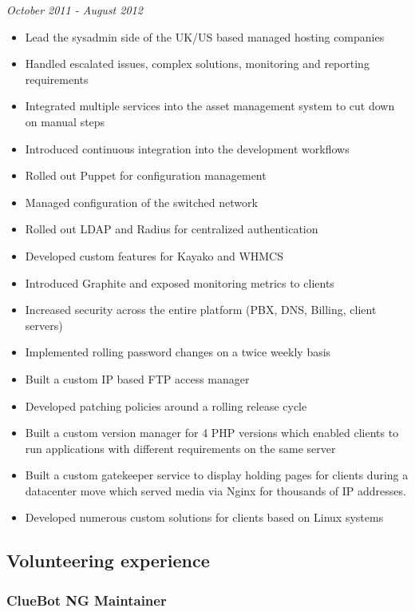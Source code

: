 \emph{October 2011 - August 2012}

\begin{itemize}
\itemsep1pt\parskip0pt
\item
  Lead the sysadmin side of the UK/US based managed hosting companies
\item
  Handled escalated issues, complex solutions, monitoring and reporting
  requirements
\item
  Integrated multiple services into the asset management system to cut
  down on manual steps
\item
  Introduced continuous integration into the development workflows
\item
  Rolled out Puppet for configuration management
\item
  Managed configuration of the switched network
\item
  Rolled out LDAP and Radius for centralized authentication
\item
  Developed custom features for Kayako and WHMCS
\item
  Introduced Graphite and exposed monitoring metrics to clients
\item
  Increased security across the entire platform (PBX, DNS, Billing,
  client servers)
\item
  Implemented rolling password changes on a twice weekly basis
\item
  Built a custom IP based FTP access manager
\item
  Developed patching policies around a rolling release cycle
\item
  Built a custom version manager for 4 PHP versions which enabled
  clients to run applications with different requirements on the same
  server
\item
  Built a custom gatekeeper service to display holding pages for clients
  during a datacenter move which served media via Nginx for thousands of
  IP addresses.
\item
  Developed numerous custom solutions for clients based on Linux systems
\end{itemize}

\subsection{Volunteering experience}\label{volunteering-experience}

\subsubsection{ClueBot NG Maintainer}\label{cluebot-ng-maintainer}

